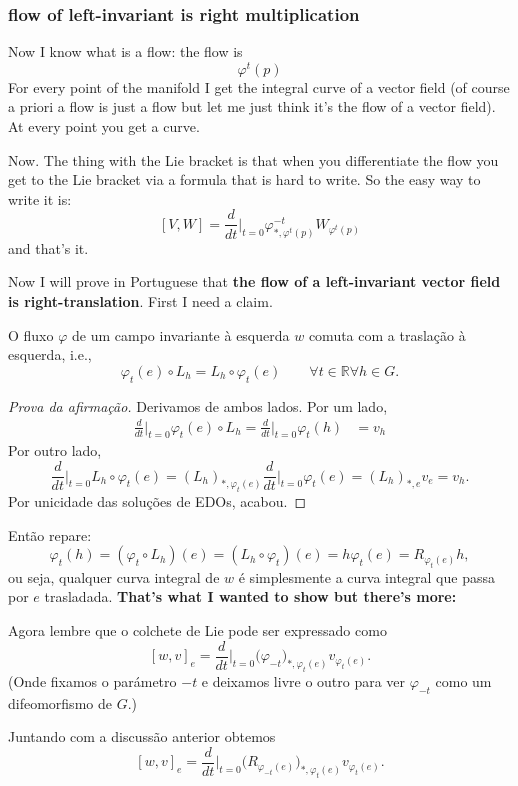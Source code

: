 \subsubsection*{flow of left-invariant is right multiplication}

Now I know what is a flow: the flow is
\[\varphi^t(p)\]
For every point of the manifold I get the integral curve of a vector field (of course a priori a flow is just a flow but let me just think it's the flow of a vector field). At every point you get a curve.

Now. The thing with the Lie bracket is that when you differentiate the flow you get to the Lie bracket via a formula that is hard to write. So the easy way to write it is:
\[[V,W]=\frac{d}{dt}\Big|_{t=0} \varphi^{-t}_{*,\varphi^t(p)}W_{\varphi^t(p)}\]
and that's it.



Now I will prove in Portuguese that \textbf{the flow of a left-invariant vector field is right-translation}. First I need a claim.

	\begin{claim}\leavevmode
	O fluxo \(\varphi\) de um campo invariante à esquerda \(w\) comuta com a traslação à esquerda, i.e.,
	\[\varphi_t(e)\circ L_h = L_h \circ \varphi_t(e)\qquad \forall t\in \mathbb{R} \forall h \in G.\]
	\end{claim}
	\begin{proof}[Prova da afirmação]\leavevmode
Derivamos de ambos lados. Por um lado,
\begin{align*}
\frac{d}{dt}\Big|_{t=0}\varphi_t(e) \circ L_h=\frac{d}{dt}\Big|_{t=0}\varphi_t(h)&=v_h\end{align*}
Por outro lado,
\[\frac{d}{dt}\Big|_{t=0}L_h \circ \varphi_t(e)=(L_h)_{*,\varphi_t(e)}\frac{d}{dt}\Big|_{t=0}\varphi_t(e)=(L_h)_{*,e}v_e=v_h.\]
Por unicidade das soluções de EDOs, acabou.
	\end{proof}
Então repare:
\[\varphi_t(h)=(\varphi_t\circ L_h)(e)=(L_h \circ \varphi_t)(e)=h\varphi_t(e)=R_{\varphi_t(e)}h,\]
ou seja, qualquer curva integral de \(w\) é simplesmente a curva integral que passa por \(e\) trasladada. \textbf{That's what I wanted to show but there's more:} 

Agora lembre que o colchete de Lie pode ser expressado como
\[[w,v]_e=\frac{d}{dt}\Big|_{t=0}\Big(\varphi_{-t}\Big)_{*,\varphi_t(e)}v_{\varphi_t(e)}.\]
(Onde fixamos o parámetro \(-t\) e deixamos livre o outro para ver \(\varphi_{-t}\) como um difeomorfismo de \(G\).)

Juntando com a discussão anterior obtemos
\[[w,v]_e=\frac{d}{dt}\Big|_{t=0}\Big(R_{\varphi_{-t}(e)}\Big)_{*,\varphi_t(e)}v_{\varphi_t(e)}.\]







